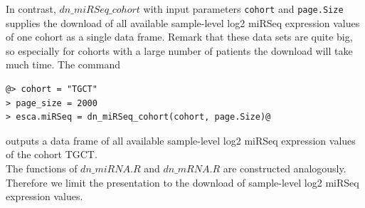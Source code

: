 \documentclass[a4paper,12pt,listof=totoc,bibliography=totoc]{scrartcl}
\begin{document}
In contrast, $dn\_miRSeq\_cohort$ with input parameters {\tt cohort} and {\tt page.Size} supplies the download of all available sample-level log2 miRSeq expression 
values of one cohort as a single data frame. 
Remark that these data sets are quite big, so especially for cohorts with a large number of patients the download will take much time. The command
\begin{lstlisting}[style=base]
@> cohort = "TGCT"
> page_size = 2000
> esca.miRSeq = dn_miRSeq_cohort(cohort, page.Size)@
\end{lstlisting}
outputs a data frame of all available sample-level log2 miRSeq expression values of the cohort TGCT. \\
The functions of $dn\_miRNA.R$ and $dn\_mRNA.R$ are constructed analogously. Therefore we limit the presentation to the download of sample-level 
log2 miRSeq expression values. \\
\end{document}
